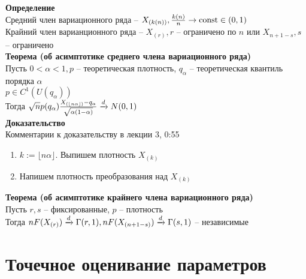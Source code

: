 \documentclass[12pt]{article}
\begin{document}
\textbf{Определение}\\
Средний член вариационного ряда -- $X_{(k(n))}, \frac{k(n)}n \rightarrow \operatorname{const} \in (0, 1)$\\
Крайний член варианционного ряда -- $X_{(r)}, r$ -- ограничено по $n$ или $X_{n + 1 - s}, s$ -- ограничено\\
\textbf{Теорема (об асимптотике среднего члена вариационного ряда)}\\
Пусть $0 < \alpha < 1, p$ -- теоретическая плотность, $q_\alpha$ -- теоретическая квантиль порядка $\alpha$\\
$p \in C^1(U(q_\alpha))$\\
Тогда $\sqrt{n} p(q_\alpha)\frac{X_{(\lfloor n\alpha \rfloor)} - q_\alpha}{\sqrt{\alpha (1-\alpha)}} \xrightarrow d N(0,1)$\\
\textbf{Доказательство}\\
Комментарии к доказательству в лекции 3, 0:55
\begin{enumerate}
	\item $k := \lfloor n\alpha \rfloor$. Выпишем плотность $X_{(k)}$
	\item Напишем плотность преобразования над $X_{(k)}$
\end{enumerate}
\textbf{Теорема (об асимптотике крайнего члена вариационного ряда)}\\
Пусть $r,s$ -- фиксированные, $p$ -- плотность\\
Тогда $nF(X_{(r)}) \xrightarrow d \Gamma(r, 1), nF(X_{(n+1-s)}) \xrightarrow d \Gamma(s, 1)$ -- независимые
\section{Точечное оценивание параметров}
\end{document}
